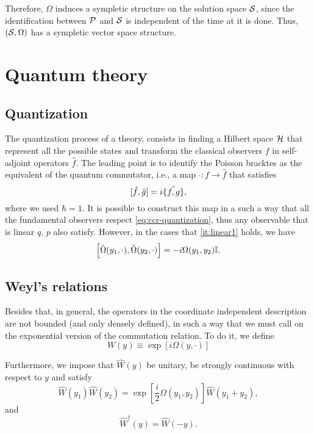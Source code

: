 Therefore, \(\Omega\) induces a sympletic structure on the solution space \({\mathcal{S}}\), since the identification between \({\mathcal{P}}\) and \({\mathcal{S}}\) is independent of the time at it is done. Thus, \(({\mathcal{S}},\Omega)\) has a sympletic vector space structure.

\section{Quantum theory}

\subsection*{Quantization}

The quantization process of a theory, consists in finding a Hilbert space \({\mathcal{H}}\) that represent all the possible states and transform the classical observers \(f\) in self-adjoint operators \(\hat{f}\). The leading point is to identify the Poisson bracktes as the equivalent of the quantum commutator, i.e., a map \(\;\hat{}:f\to\hat{f}\) that satisfies
\begin{equation}
    \relax[\hat{f},\hat{g}]=i\hat{\{f,g\}},
    \label{eq:ccr-quantization}
\end{equation}
where we used \(\hbar=1\). It is possible to construct this map in a such a way that all the fundamental observers respect \cref{eq:ccr-quantization}, thus any observable that is linear \(q,\,p\) also satisfy. However, in the cases that \cref{it:linear1} holds, we have
\begin{equation}
    \relax\left[\hat{\Omega}(y_1,\cdot),\hat{\Omega}(y_2,\cdot)\right]=-i\Omega(y_1,y_2){\mathbb{I}}.
\end{equation}

\subsection*{Weyl's relations}

Besides that, in general, the operators in the coordinate independent description are not bounded (and only densely defined), in such a way that we must call on the exponential version of the commutation relation. To do it, we define 
\begin{equation}
    W(y)\equiv\exp{\left[i\Omega(y,\cdot)\right]}
\end{equation}

Furthermore, we impose that \(\hat{W}(y)\) be unitary, be strongly continuous with respect to \(y\) and satisfy
\begin{equation}
    \hat{W}(y_1)\hat{W}(y_2)=\exp{\left[\frac{i}{2}\Omega(y_1,y_2)\right]}\hat{W}(y_1+y_2),
    \label{eq:weyl1}
\end{equation}
and
\begin{equation}
    \hat{W}^{\dagger}(y)=\hat{W}(-y).
    \label{eq:weyl2}
\end{equation}

